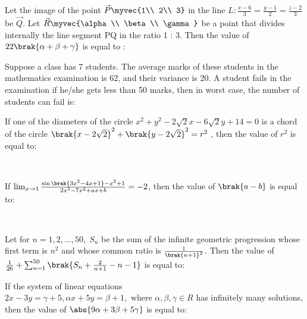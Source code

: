 
\iffalse
    \title{2020}
    \author{EE24BTECH11015}
    \section{integer}
\fi

\item  Let the image of the point $\vec{P}\myvec{1\\ 2\\ 3}$ in the line $L: \frac{x - 6}{3} = \frac{y - 1}{2} = \frac{z - 2}{3}$ be $\vec{Q}$. Let $\vec{R} \myvec{\alpha \\ \beta \\ \gamma}$ be a point that divides internally the line segment PQ in the ratio 1 : 3. Then the value of $22\brak{\alpha + \beta + \gamma}$ is equal to :\hfill{}
\\


\item Suppose a class has 7 students. The average marks of these students in the mathematics examination is 62, and their variance is 20. A student fails in the examination if he/she gets less than 50 marks, then in worst case, the number of students can fail is:\hfill{}
\\


\item If one of the diameters of the circle $x^2 + y^2 - 2\sqrt{2}x - 6\sqrt{2}y + 14 = 0$ is a chord of the circle
${\brak{ x - 2\sqrt{2} }}^2 + {\brak{ y - 2\sqrt{2} }}^2 = r^2$ , then the value of $r^2$ is equal to:

\hfill{}
\\

\item If $\lim_{x \to 1} \frac{\sin\brak{3x^2 - 4x + 1} - x^2 + 1}{2x^3 - 7x^2 + ax + b} = -2$, then the value of $\brak{a - b}$ is equal to:

\hfill{}
\\

\item Let for $n = 1, 2,\dots, 50, \; S_n$ be the sum of the infinite geometric progression whose first term is $n^2$ and whose common ratio is $\frac{1}{\brak{n + 1}^2}$. Then the value of $\frac{1}{26} + \sum_{n=1}^{50} \brak{ S_n + \frac{2}{n + 1} - n - 1} $ is equal to:\hfill{}
\\


\item If the system of linear equations $2x - 3y = \gamma + 5, \alpha x + 5y = \beta + 1, \text{ where } \alpha, \beta, \gamma \in R$ has infinitely many solutions, then the value of $\abs{9\alpha + 3\beta + 5\gamma}$ is equal to:

